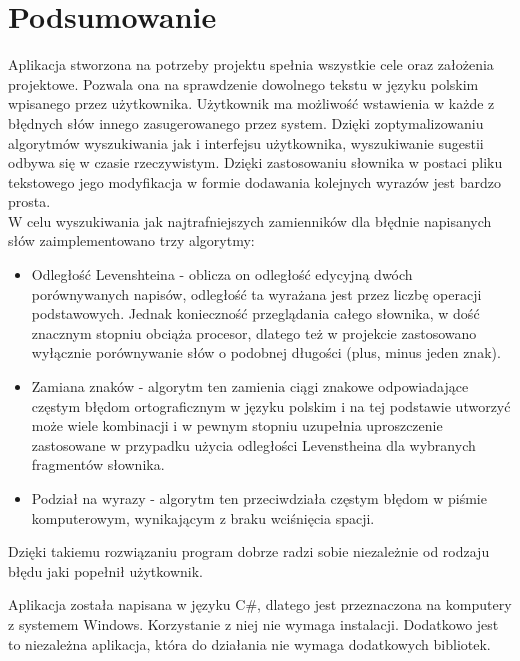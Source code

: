 \chapter{Podsumowanie}

Aplikacja stworzona na potrzeby projektu spełnia wszystkie cele oraz założenia projektowe. Pozwala ona na sprawdzenie dowolnego tekstu w języku polskim wpisanego przez użytkownika. Użytkownik ma możliwość wstawienia w każde z błędnych słów innego zasugerowanego przez system. Dzięki zoptymalizowaniu algorytmów wyszukiwania jak i interfejsu użytkownika, wyszukiwanie sugestii odbywa się w czasie rzeczywistym. Dzięki zastosowaniu słownika w postaci pliku tekstowego jego modyfikacja w formie dodawania kolejnych wyrazów jest bardzo prosta. \\ 

W celu wyszukiwania jak najtrafniejszych zamienników dla błędnie napisanych słów zaimplementowano trzy algorytmy:
\begin{itemize}
	\item Odległość Levenshteina - oblicza on odległość edycyjną dwóch porównywanych napisów, odległość ta wyrażana jest przez liczbę operacji podstawowych. Jednak konieczność przeglądania całego słownika, w dość znacznym stopniu obciąża procesor, dlatego też w projekcie zastosowano wyłącznie porównywanie słów o podobnej długości (plus, minus jeden znak).
	\item Zamiana znaków - algorytm ten zamienia ciągi znakowe odpowiadające częstym błędom ortograficznym w języku polskim i na tej podstawie utworzyć może wiele kombinacji i w pewnym stopniu uzupełnia uproszczenie zastosowane w przypadku użycia odległości Levenstheina dla wybranych fragmentów słownika.
	\item Podział na wyrazy - algorytm ten przeciwdziała częstym błędom w piśmie komputerowym, wynikającym z braku wciśnięcia spacji. 
\end{itemize}

Dzięki takiemu rozwiązaniu program dobrze radzi sobie niezależnie od rodzaju błędu jaki popełnił użytkownik.

Aplikacja została napisana w języku C\#, dlatego jest przeznaczona na komputery z systemem Windows. Korzystanie z niej nie wymaga instalacji. Dodatkowo jest to niezależna aplikacja, która do działania nie wymaga dodatkowych bibliotek.